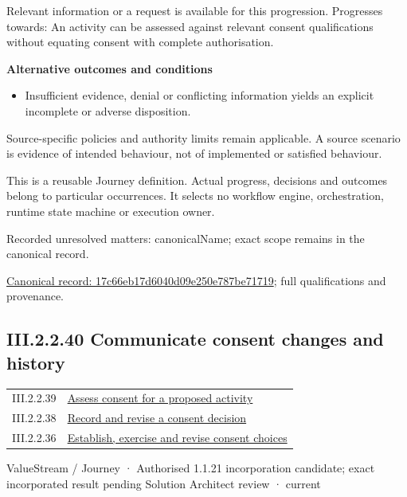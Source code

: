 Relevant information or a request is available for this progression. Progresses towards: An activity can be assessed against relevant consent qualifications without equating consent with complete authorisation.



\par\medskip\textbf{Alternative outcomes and conditions}\par


\begin{itemize}


\item Insufficient evidence, denial or conflicting information yields an explicit incomplete or adverse disposition.

\end{itemize}


Source-specific policies and authority limits remain applicable. A source scenario is evidence of intended behaviour, not of implemented or satisfied behaviour.



This is a reusable Journey definition. Actual progress, decisions and outcomes belong to particular occurrences. It selects no workflow engine, orchestration, runtime state machine or execution owner.


{\small Recorded unresolved matters: canonicalName; exact scope remains in the canonical record.}\par
{\footnotesize \href{../../../../continuum/strategy/value-stream/17c66eb17d6040d09e250e787be71719.md}{Canonical record: 17c66eb17d6040d09e250e787be71719}; full qualifications and provenance.}\par
\subsection*{III.2.2.40 Communicate consent changes and history}
\label{navigation:III.2.2.40}

\begin{longtable}{p{.22\linewidth}p{.73\linewidth}}
III.2.2.39 & \hyperref[element:17c66eb17d6040d09e250e787be71719]{Assess consent for a proposed activity} \\
III.2.2.38 & \hyperref[element:74779c85619741d18053a2304457190b]{Record and revise a consent decision} \\
III.2.2.36 & \hyperref[element:850bba32295c4e53b20036b80f77f491]{Establish, exercise and revise consent choices} \\
\end{longtable}
\label{element:9356b876f2aa427f989ad4f1b7f2fa4c}
{\small ValueStream / Journey · Authorised 1.1.21 incorporation candidate; exact incorporated result pending Solution Architect review · current}\par


